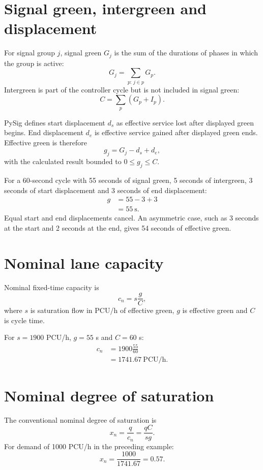 \section{Signal green, intergreen and displacement}
For signal group $j$, signal green $G_j$ is the sum of the durations of phases in which the group is active:
\begin{equation}
G_j=\sum_{p:\,j\in p}G_p.
\end{equation}
Intergreen is part of the controller cycle but is not included in signal green:
\begin{equation}
C=\sum_p(G_p+I_p).
\end{equation}

PySig defines start displacement $d_s$ as effective service lost after displayed green begins. End displacement $d_e$ is effective service gained after displayed green ends. Effective green is therefore
\begin{equation}
g_j=G_j-d_s+d_e,
\end{equation}
with the calculated result bounded to $0\leq g_j\leq C$.

For a 60-second cycle with 55 seconds of signal green, 5 seconds of intergreen, 3 seconds of start displacement and 3 seconds of end displacement:
\begin{align}
g &= 55-3+3\\
  &= 55\ \text{s}.
\end{align}
Equal start and end displacements cancel. An asymmetric case, such as 3 seconds at the start and 2 seconds at the end, gives 54 seconds of effective green.

\section{Nominal lane capacity}
Nominal fixed-time capacity is
\begin{equation}
c_n=s\frac{g}{C},
\end{equation}
where $s$ is saturation flow in PCU/h of effective green, $g$ is effective green and $C$ is cycle time.

For $s=1900$ PCU/h, $g=55$ s and $C=60$ s:
\begin{align}
c_n &=1900\frac{55}{60}\\
    &=1741.67\ \text{PCU/h}.
\end{align}

\section{Nominal degree of saturation}
The conventional nominal degree of saturation is
\begin{equation}
x_n=\frac{q}{c_n}=\frac{qC}{sg}.
\end{equation}
For demand of 1000 PCU/h in the preceding example:
\begin{equation}
x_n=\frac{1000}{1741.67}=0.57.
\end{equation}

